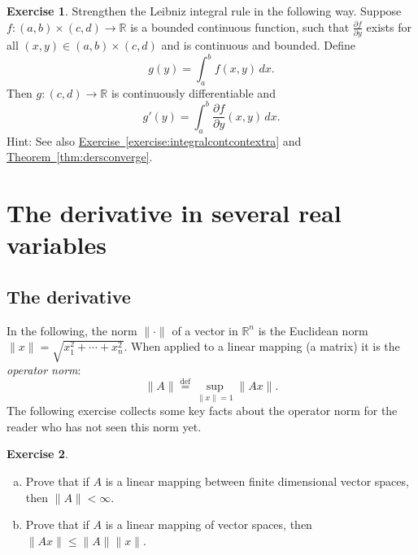 \documentclass[12pt,openany]{book}
\newcommand{\snorm}[1]{\lVert {#1} \rVert}
\newcommand{\R}{{\mathbb{R}}}
\newcommand{\myindex}[1]{#1\index{#1}}
\theoremstyle{plain}
\theoremstyle{remark}
\theoremstyle{definition}
\newenvironment{exbox}{%
    \def\FrameCommand{\vrule width 1pt \relax\hspace {10pt}}%
    \MakeFramed {\advance \hsize -\width \FrameRestore }%
}{%
    \endMakeFramed
}
\newenvironment{exparts}{%
    \leavevmode\begin{enumerate}[a),noitemsep,topsep=0pt,parsep=0pt,partopsep=0pt]
}{%
    \end{enumerate}
}
\theoremstyle{exercise}
\newtheorem{exercise}{Exercise}[section]
\theoremstyle{example}
\newcommand{\exerciseref}[1]{\hyperref[#1]{Exercise~\ref*{#1}}}
\newcommand{\thmref}[1]{\hyperref[#1]{Theorem~\ref*{#1}}}
\begin{document}
\begin{exbox}
\begin{samepage}
\begin{exercise} \label{exercise:strongerleibniz}
Strengthen the Leibniz integral rule in the following way.
Suppose $f \colon (a,b) \times (c,d) \to \R$ is a bounded continuous function,
such that $\frac{\partial f}{\partial y}$ exists for all $(x,y) \in (a,b)
\times (c,d)$ and is continuous and bounded.  Define
\begin{equation*}
g(y) = \int_a^b f(x,y) \,dx .
\end{equation*}
Then $g \colon (c,d) \to \R$ is continuously differentiable and
\begin{equation*}
g'(y) = \int_a^b \frac{\partial f}{\partial y}(x,y) \,dx .
\end{equation*}
Hint: See also \exerciseref{exercise:integralcontcontextra} and
\thmref{thm:dersconverge}.
\end{exercise}
\end{samepage}
\end{exbox}


\section{The derivative in several real variables} \label{sec:derinsv}

\subsection{The derivative}

In the following, the norm $\snorm{\cdot}$ of a vector in $\R^n$
is the Euclidean norm $\snorm{x} = \sqrt{x_1^2+\cdots+x_n^2}$.
When applied to a linear mapping (a matrix) it is the
\emph{\myindex{operator norm}}:
\begin{equation*}
\snorm{A} \overset{\text{def}}{=} \sup_{\snorm{x} = 1} \snorm{Ax} .
\end{equation*}
The following exercise collects some key facts about the operator norm
for the reader who has not seen this norm yet.

\begin{exbox}
\begin{exercise}
\begin{exparts} 
\item
Prove that if $A$ is a linear mapping between finite dimensional vector
spaces, then $\snorm{A} < \infty$.
\item
Prove that if $A$ is a linear mapping of vector spaces, then
$\snorm{Ax} \leq \snorm{A} \snorm{x}$.
\end{exparts} 
\end{exercise}
\end{exbox}
\end{document}
